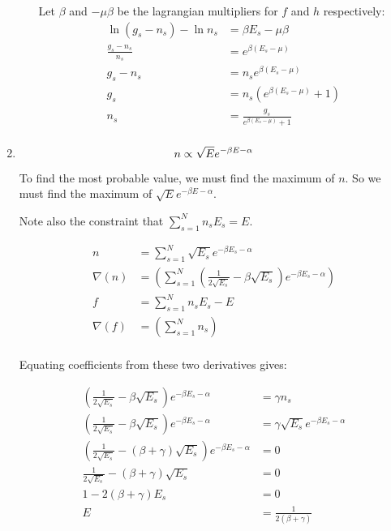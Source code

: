 \documentclass[10pt,\jkfside,a4paper]{article}
\begin{document}
\begin{enumerate}
\begin{enumerate}
Let $\beta$ and $-\mu\beta$ be the lagrangian multipliers for $f$ and $h$ respectively:
\begin{equation}
\begin{split}
\ln (g_s - n_s) - \ln n_s &= \beta E_s - \mu\beta \\
\frac{g_s - n_s}{n_s} &= e^{\beta (E_s - \mu)} \\
g_s - n_s &= n_s e^{\beta (E_s - \mu)} \\
g_s &= n_s(e^{\beta (E_s - \mu)} + 1) \\
n_s &= \frac{g_s}{e^{\beta (E_s - \mu)} + 1} \\
\end{split}
\end{equation}

\end{enumerate}

\item 

\begin{equation}
n \propto \sqrt{E}e^{-\beta E - \alpha} \\
\end{equation}

To find the most probable value, we must find the maximum of $n$. So we must find the maximum of 
$\sqrt{E}e^{-\beta E - \alpha}$. 

Note also the constraint that $\sum^N_{s=1} n_sE_s = E$.

\begin{equation}
\begin{split}
n &= \sum^N_{s=1} \sqrt{E_s}e^{-\beta E_s - \alpha} \\
\nabla(n) &= \left(\sum^N_{s=1}\left(\frac{1}{2\sqrt{E_s}} - \beta\sqrt{E_s}\right)e^{-\beta E_s - \alpha}\right) \\
f &= \sum^N_{s=1} n_s E_s - \hat{E} \\
\nabla(f) &= \left(\sum^N_{s=1}n_s\right) \\
\end{split}
\end{equation}

Equating coefficients from these two derivatives gives:

\begin{equation}
\begin{split}
\left(\frac{1}{2\sqrt{E_s}} - \beta\sqrt{E_s}\right)e^{-\beta E_s - \alpha} &= \gamma n_s \\
\left(\frac{1}{2\sqrt{E_s}} - \beta\sqrt{E_s}\right)e^{-\beta E_s - \alpha} &= \gamma \sqrt{E_s}e^{-\beta E_s - \alpha} \\
\left(\frac{1}{2\sqrt{E_s}} - (\beta + \gamma)\sqrt{E_s}\right)e^{-\beta E_s - \alpha} &= 0 \\
\frac{1}{2\sqrt{E_s}} - (\beta + \gamma)\sqrt{E_s} &= 0 \\
1 - 2(\beta + \gamma)E_s &= 0 \\
E &= \frac{1}{2(\beta + \gamma)} \\
\end{split}
\end{equation}


\end{enumerate}
\end{document}
